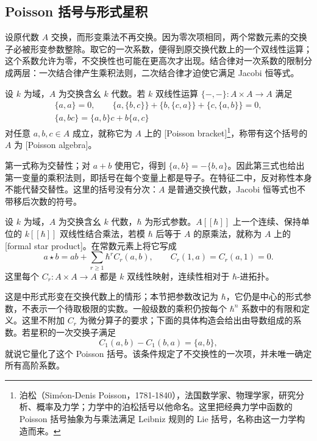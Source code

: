 \subsection{Poisson 括号与形式星积}
\label{b4:subsec:1304:04}

设原代数 \(A\) 交换，而形变乘法不再交换。因为零次项相同，两个常数元素的交换子必被形变参数整除。取它的一次系数，便得到原交换代数上的一个双线性运算；这个系数允许为零，不交换性也可能在更高次才出现。结合律对一次系数的限制分成两层：一次结合律产生乘积法则，二次结合律才迫使它满足 Jacobi 恒等式。

\begin{definition}\label{b4:def:poisson-algebra}
	设 \(k\) 为域，\(A\) 为交换含幺 \(k\) 代数。若 \(k\) 双线性运算 \(\{-,-\}:A\times A\to A\) 满足
	\[
		\begin{gathered}
			\{a,a\}=0,\qquad
			\{a,\{b,c\}\}+\{b,\{c,a\}\}+\{c,\{a,b\}\}=0,\\
			\{a,bc\}=\{a,b\}c+b\{a,c\}
		\end{gathered}
	\]
	对任意 \(a,b,c\in A\) 成立，就称它为 \(A\) 上的 [Poisson bracket]\footnote{泊松（Siméon-Denis Poisson，1781-1840），法国数学家、物理学家，研究分析、概率及力学；力学中的泊松括号以他命名。这里把经典力学中函数的 Poisson 括号抽象为与乘法满足 Leibniz 规则的 Lie 括号，名称由这一力学构造而来。}，称带有这个括号的 \(A\) 为 [Poisson algebra]。
\end{definition}

第一式称为交替性；对 \(a+b\) 使用它，得到 \(\{a,b\}=-\{b,a\}\)。因此第三式也给出第一变量的乘积法则，即括号在每个变量上都是导子。在特征二中，反对称性本身不能代替交替性。这里的括号没有分次：\(A\) 是普通交换代数，Jacobi 恒等式也不带移后次数的符号。

\begin{definition}\label{b4:def:formal-star-product}
	设 \(k\) 为域，\(A\) 为交换含幺 \(k\) 代数，\(\hbar\) 为形式参数。\(A[\![\hbar]\!]\) 上一个连续、保持单位的 \(k[\![\hbar]\!]\) 双线性结合乘法，若模 \(\hbar\) 后等于 \(A\) 的原乘法，就称为 \(A\) 上的[formal star product]。在常数元素上将它写成
	\[
		a\star b=ab+\sum_{r\ge1}\hbar^r C_r(a,b),\qquad
		C_r(1,a)=C_r(a,1)=0.
	\]
	这里每个 \(C_r:A\times A\to A\) 都是 \(k\) 双线性映射，连续性相对于 \(\hbar\)-进拓扑。
\end{definition}

这是中形式形变在交换代数上的情形；本节把参数改记为 \(\hbar\)，它仍是中心的形式参数，不表示一个待取极限的实数。一般级数的乘积仍按每个 \(\hbar^n\) 系数中的有限和定义。这里不附加 \(C_r\) 为微分算子的要求；下面的具体构造会给出由导数组成的系数。若星积的一次交换子满足
\[
	C_1(a,b)-C_1(b,a)=\{a,b\},
\]
就说它量化了这个 Poisson 括号。该条件规定了不交换性的一次项，并未唯一确定所有高阶系数。

